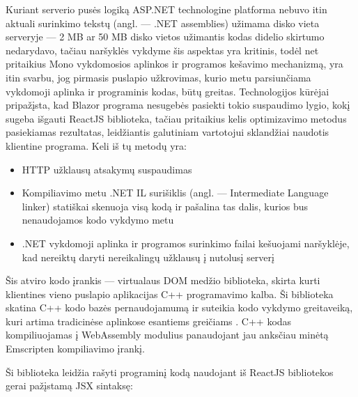 \documentclass{VUMIFPSkursinis}
\begin{document}
Kuriant serverio pusės logiką ASP.NET technologine platforma nebuvo itin aktuali surinkimo tekstų (angl. — .NET assemblies) užimama disko vieta serveryje — 2 MB ar 50 MB disko vietos užimantis kodas didelio skirtumo nedarydavo, tačiau naršyklės vykdyme šis aspektas yra kritinis, todėl net pritaikius Mono vykdomosios aplinkos ir programos kešavimo mechanizmą, yra itin svarbu, jog pirmasis puslapio užkrovimas, kurio metu parsiunčiama vykdomoji aplinka ir programinis kodas, būtų greitas. Technologijos kūrėjai pripažįsta, kad Blazor programa nesugebės pasiekti tokio suspaudimo lygio, kokį sugeba išgauti ReactJS biblioteka, tačiau pritaikius kelis optimizavimo metodus pasiekiamas rezultatas, leidžiantis galutiniam vartotojui sklandžiai naudotis klientine programa. Keli iš tų metodų yra:
\begin{itemize}
    \item HTTP užklausų atsakymų suspaudimas
    \item Kompiliavimo metu .NET IL surišiklis (angl. — Intermediate Language linker) statiškai skenuoja visą kodą ir pašalina tas dalis, kurios bus nenaudojamos kodo vykdymo metu
    \item .NET vykdomoji aplinka ir programos surinkimo failai kešuojami naršyklėje, kad nereiktų daryti nereikalingų užklausų į nutolusį serverį
\end{itemize}

Šis atviro kodo įrankis — virtualaus DOM medžio biblioteka, skirta kurti klientines vieno puslapio aplikacijas C++ programavimo kalba. Ši biblioteka skatina C++ kodo bazės pernaudojamumą ir suteikia kodo vykdymo greitaveiką, kuri artima tradicinėse aplinkose esantiems greičiams \cite{ASM19}. C++ kodas kompiliuojamas į WebAssembly modulius panaudojant jau anksčiau minėtą Emscripten kompiliavimo įrankį.

Ši biblioteka leidžia rašyti programinį kodą naudojant iš ReactJS bibliotekos gerai pažįstamą JSX sintaksę:
\end{document}

